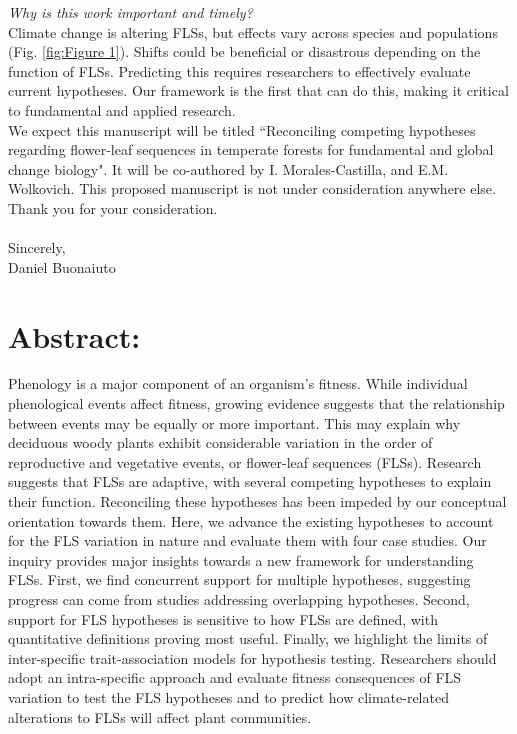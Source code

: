 \documentclass[11pt,a4paper]{article}
\begin{document}
\noindent \emph{Why is this work important and timely?}\\

\noindent Climate change is altering FLSs, but effects vary across species and populations (Fig. \ref{fig:Figure 1}). Shifts could be beneficial or disastrous depending on the function of FLSs. Predicting this requires researchers to effectively evaluate current hypotheses. Our framework is the first that can do this, making it critical to fundamental and applied research.\\

 \noindent We expect this manuscript will be titled ``Reconciling competing hypotheses regarding flower-leaf sequences in temperate forests for fundamental and global change biology". It will be co-authored by I. Morales-Castilla, and E.M. Wolkovich. This proposed manuscript is not under consideration anywhere else. Thank you for your consideration.\\
\\Sincerely,\\

Daniel Buonaiuto
\newpage
\section*{Abstract:}
Phenology is a major component of an organism's fitness. While individual phenological events affect fitness, growing evidence suggests that the relationship between events may be equally or more important. This may explain why deciduous woody plants exhibit considerable variation in the order of reproductive and vegetative events, or flower-leaf sequences (FLSs). Research suggests that FLSs are adaptive, with several competing hypotheses to explain their function. Reconciling these hypotheses has been impeded by our conceptual orientation towards them. Here, we advance the existing hypotheses to account for the FLS variation in nature and evaluate them with four case studies. Our inquiry provides major insights towards a new framework for understanding FLSs. First, we find concurrent support for multiple hypotheses, suggesting progress can come from studies addressing overlapping hypotheses. Second, support for FLS hypotheses is sensitive to how FLSs are defined, with quantitative definitions proving most useful. Finally, we highlight the limits of inter-specific trait-association models for hypothesis testing. Researchers should adopt an intra-specific approach and evaluate fitness consequences of FLS variation to test the FLS hypotheses and to predict how climate-related alterations to FLSs will affect plant communities. %
\end{document}
